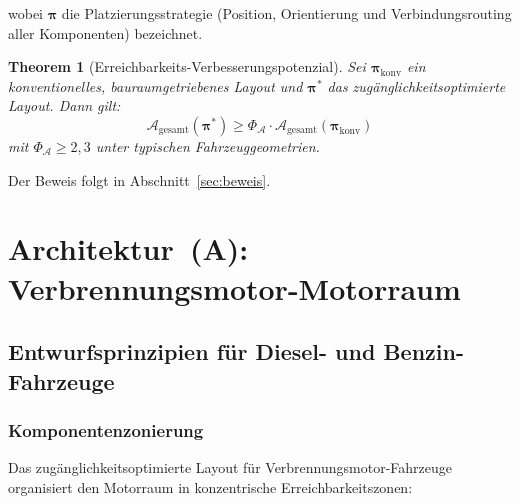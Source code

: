 ﻿\documentclass[12pt,a4paper]{article}
\newtheorem{theorem}{Theorem}[section]
\begin{document}
wobei $\boldsymbol{\pi}$ die Platzierungsstrategie (Position, Orientierung und
Verbindungsrouting aller Komponenten) bezeichnet.

\begin{theorem}[Erreichbarkeits-Verbesserungspotenzial]
	\label{thm:erreichbarkeit}
	Sei $\boldsymbol{\pi}_\mathrm{konv}$ ein konventionelles, bauraumgetriebenes
	Layout und $\boldsymbol{\pi}^*$ das zugänglichkeitsoptimierte Layout. Dann gilt:
	\begin{equation}
		\mathcal{A}_\mathrm{gesamt}(\boldsymbol{\pi}^*) \geq
		\Phi_\mathcal{A} \cdot \mathcal{A}_\mathrm{gesamt}(\boldsymbol{\pi}_\mathrm{konv})
		\label{eq:erreichbarkeits_theorem}
	\end{equation}
	mit $\Phi_\mathcal{A} \geq 2{,}3$ unter typischen Fahrzeuggeometrien.
\end{theorem}

Der Beweis folgt in Abschnitt~\ref{sec:beweis}.

\section{Architektur~(A): Verbrennungsmotor-Motorraum}
\label{sec:architektur_a}

\subsection{Entwurfsprinzipien für Diesel- und Benzin-Fahrzeuge}

\subsubsection{Komponentenzonierung}

Das zugänglichkeitsoptimierte Layout für Verbrennungsmotor-Fahrzeuge organisiert
den Motorraum in konzentrische Erreichbarkeitszonen:
\end{document}
